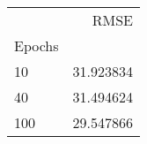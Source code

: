 \begin{tabular}{lr}
 & RMSE \\
Epochs &  \\
10 & 31.923834 \\
40 & 31.494624 \\
100 & 29.547866 \\
\end{tabular}
